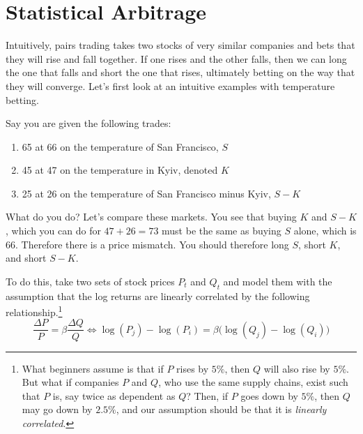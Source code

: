\documentclass{article}
\begin{document}
\section{Statistical Arbitrage}

  Intuitively, pairs trading takes two stocks of very similar companies and bets that they will rise and fall together. If one rises and the other falls, then we can long the one that falls and short the one that rises, ultimately betting on the way that they will converge. Let's first look at an intuitive examples with temperature betting. 

  \begin{example}
    Say you are given the following trades:
    \begin{enumerate}
      \item 65 at 66 on the temperature of San Francisco, $S$
      \item 45 at 47 on the temperature in Kyiv, denoted $K$
      \item 25 at 26 on the temperature of San Francisco minus Kyiv, $S - K$ 
    \end{enumerate}
    What do you do? Let's compare these markets. You see that buying $K$ and $S - K$, which you can do for $47 + 26 = 73$ must be the same as buying $S$ alone, which is $66$. Therefore there is a price mismatch. You should therefore long $S$, short $K$, and short $S - K$. 
  \end{example}

  To do this, take two sets of stock prices $P_t$ and $Q_t$ and model them with the assumption that the log returns are linearly correlated by the following relationship.\footnote{What beginners assume is that if $P$ rises by $5\%$, then $Q$ will also rise by $5\%$. But what if companies $P$ and $Q$, who use the same supply chains, exist such that $P$ is, say twice as dependent as $Q$? Then, if $P$ goes down by $5\%$, then $Q$ may go down by $2.5\%$, and our assumption should be that it is \textit{linearly correlated}. }
  \begin{equation}
    \frac{\Delta P}{P} = \beta \frac{\Delta Q}{Q} \iff \log(P_j) - \log(P_i) = \beta \big( \log(Q_j) - \log(Q_i) \big)
  \end{equation}
\end{document}

